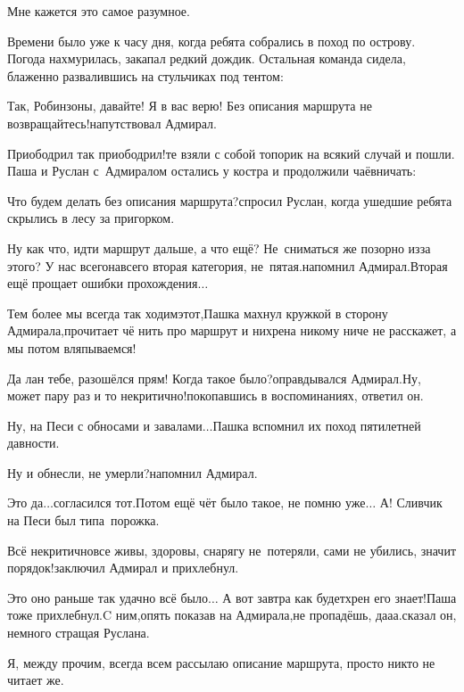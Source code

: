 \diagdash Мне кажется это самое разумное.

Времени было уже к часу дня, когда ребята собрались в поход по острову. Погода нахмурилась, закапал редкий дождик. Остальная команда сидела, блаженно развалившись на стульчиках под тентом:

\diagdash Так, Робинзоны, давайте! Я в вас верю! Без описания маршрута не возвращайтесь!\mdash напутствовал Адмирал.

\diagdash Приободрил так приободрил!\mdash те взяли с собой топорик на всякий случай и пошли. Паша и Руслан с~Адмиралом остались у костра и продолжили чаёвничать:

\diagdash Что будем делать без описания маршрута?\mdash спросил Руслан, когда ушедшие ребята скрылись в лесу за пригорком.

\diagdash Ну как что, идти маршрут дальше, а что ещё? Не~сниматься же позорно из\sdash за этого? У нас всего\sdash навсего вторая категория, не~пятая.\mdash напомнил Адмирал.\mdash Вторая ещё прощает ошибки прохождения$\ldots$

\diagdash Тем более мы всегда так ходим\mdash этот,\mdash Пашка махнул кружкой в сторону Адмирала,\mdash прочитает чё нить про маршрут и нихрена никому ниче не расскажет, а мы потом вляпываемся!

\diagdash Да лан тебе, разошёлся прям! Когда такое было?\mdash оправдывался Адмирал.\mdash Ну, может пару раз и то некритично!\mdash покопавшись в воспоминаниях, ответил он.

\diagdash Ну, на Песи с обносами и завалами$\ldots$\mdash Пашка вспомнил их поход пятилетней давности.

\diagdash Ну и обнесли, не умерли?\mdash напомнил Адмирал.

\diagdash Это да$\ldots$\mdash согласился тот.\mdash Потом ещё чёт было такое, не помню уже$\ldots$ А! Сливчик на Песи был типа~порожка.

\diagdash Всё некритично\mdash все живы, здоровы, снарягу не~потеряли, сами не убились, значит порядок!\mdash заключил Адмирал и прихлебнул.

\diagdash Это оно раньше так удачно всё было$\ldots$ А вот завтра как будет\mdash хрен его знает!\mdash Паша тоже прихлебнул.\mdash C ним,\mdash опять показав на Адмирала,\mdash не пропадёшь, да\sdash а\sdash а.\mdash сказал он, немного стращая Руслана.

\diagdash Я, между прочим, всегда всем рассылаю описание маршрута, просто никто не читает же.

